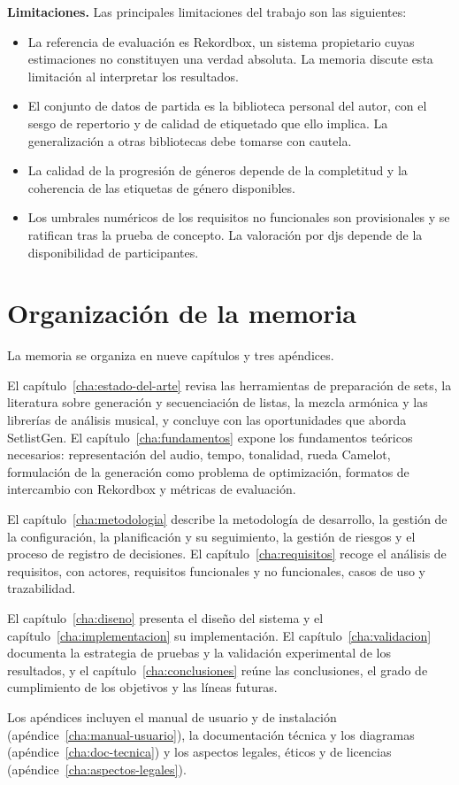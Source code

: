 \medskip\noindent\textbf{Limitaciones.} Las principales limitaciones del trabajo son las siguientes:
\begin{itemize}
  \item La referencia de evaluación es Rekordbox, un sistema propietario cuyas estimaciones no constituyen una verdad absoluta. La memoria discute esta limitación al interpretar los resultados.
  \item El conjunto de datos de partida es la biblioteca personal del autor, con el sesgo de repertorio y de calidad de etiquetado que ello implica. La generalización a otras bibliotecas debe tomarse con cautela.
  \item La calidad de la progresión de géneros depende de la completitud y la coherencia de las etiquetas de género disponibles.
  \item Los umbrales numéricos de los requisitos no funcionales son provisionales y se ratifican tras la prueba de concepto. La valoración por \acsp{dj} depende de la disponibilidad de participantes.
\end{itemize}

\section{Organización de la memoria}
\label{sec:intro-organizacion}

La memoria se organiza en nueve capítulos y tres apéndices.

El capítulo~\ref{cha:estado-del-arte} revisa las herramientas de preparación de sets, la literatura sobre generación y secuenciación de listas, la mezcla armónica y las librerías de análisis musical, y concluye con las oportunidades que aborda SetlistGen. El capítulo~\ref{cha:fundamentos} expone los fundamentos teóricos necesarios: representación del audio, tempo, tonalidad, rueda Camelot, formulación de la generación como problema de optimización, formatos de intercambio con Rekordbox y métricas de evaluación.

El capítulo~\ref{cha:metodologia} describe la metodología de desarrollo, la gestión de la configuración, la planificación y su seguimiento, la gestión de riesgos y el proceso de registro de decisiones. El capítulo~\ref{cha:requisitos} recoge el análisis de requisitos, con actores, requisitos funcionales y no funcionales, casos de uso y trazabilidad.

El capítulo~\ref{cha:diseno} presenta el diseño del sistema y el capítulo~\ref{cha:implementacion} su implementación. El capítulo~\ref{cha:validacion} documenta la estrategia de pruebas y la validación experimental de los resultados, y el capítulo~\ref{cha:conclusiones} reúne las conclusiones, el grado de cumplimiento de los objetivos y las líneas futuras.

Los apéndices incluyen el manual de usuario y de instalación (apéndice~\ref{cha:manual-usuario}), la documentación técnica y los diagramas (apéndice~\ref{cha:doc-tecnica}) y los aspectos legales, éticos y de licencias (apéndice~\ref{cha:aspectos-legales}).








